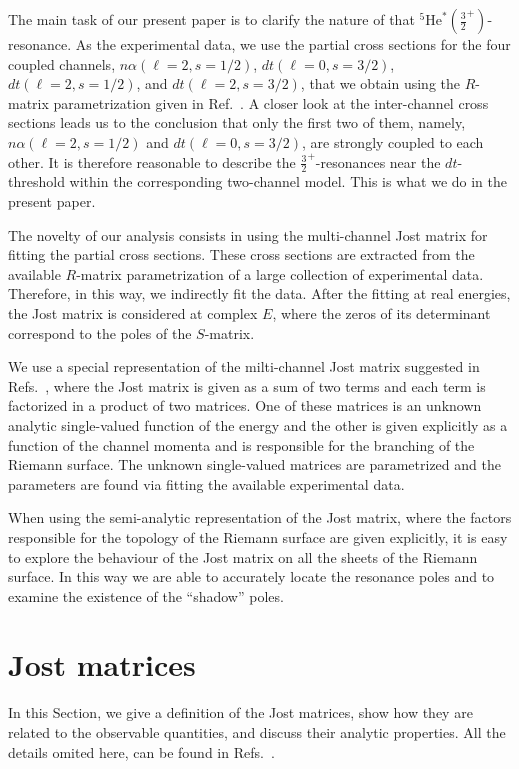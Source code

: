 \documentclass[12pt]{article}
\begin{document}
The main task of our present paper is to clarify the nature of that
${}^5\mathrm{He}^*(\frac32^+)$-resonance.
As the experimental data, we use the partial cross sections for the four
coupled channels, $n\alpha(\ell=2,s=1/2)$, $dt(\ell=0,s=3/2)$,
$dt(\ell=2,s=1/2)$, and $dt(\ell=2,s=3/2)$, that we obtain using the $R$-matrix
parametrization given in Ref.~\cite{PRL59}. A closer look at the
inter-channel cross sections leads us to
the conclusion that only the first two of them, namely, $n\alpha(\ell=2,s=1/2)$
and $dt(\ell=0,s=3/2)$, are strongly coupled to each other. It is therefore
reasonable to describe the $\frac32^+$-resonances near the $dt$-threshold within
the corresponding two-channel model. This is what we do in the present paper.

The novelty of our analysis consists in using the multi-channel Jost matrix for 
fitting the partial cross sections. These cross sections are extracted from 
the available $R$-matrix parametrization of a large collection of experimental 
data. Therefore, in this way, we indirectly fit the data.
After the fitting at real energies, the Jost matrix is considered at complex 
$E$, where the zeros of its determinant correspond to the poles of the 
$S$-matrix.

We use a special representation of the milti-channel Jost matrix suggested in
Refs.~\cite{our.MultiCh, our_Coulomb}, where the Jost matrix is given as a sum
of two terms and each term is factorized in a product of two matrices. One
of these matrices is an unknown analytic single-valued function of the energy
and the other is given explicitly as a function of the channel momenta and is
responsible for the branching of the Riemann surface. The unknown single-valued
matrices are parametrized and the parameters are found via fitting the
available experimental data.

When using the semi-analytic representation of the Jost matrix, where the
factors responsible for the topology of the Riemann surface are given
explicitly, it is easy to explore the behaviour of the Jost matrix on all the
sheets of the Riemann surface. In this way we are able to accurately locate
the resonance poles and to examine the existence of the ``shadow'' poles.

\section{Jost matrices}
In this Section, we give a definition of the Jost matrices, show how they are
related to the observable quantities, and discuss their analytic properties.
All the details omited here, can be found in
Refs.~\cite{our.MultiCh,our_Coulomb,two_channel}.
\end{document}
